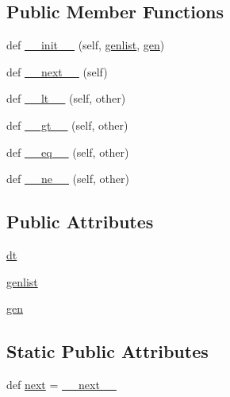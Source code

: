 \subsection*{Public Member Functions}
\begin{DoxyCompactItemize}
\item 
def \hyperlink{classdateutil_1_1rrule_1_1rruleset_1_1__genitem_a8900893f286614708976c0ee31b39bef}{\+\_\+\+\_\+init\+\_\+\+\_\+} (self, \hyperlink{classdateutil_1_1rrule_1_1rruleset_1_1__genitem_a8b48fbda46d708d8649dc3f4a15b351e}{genlist}, \hyperlink{classdateutil_1_1rrule_1_1rruleset_1_1__genitem_a79dc2bb16f088fb093f0bed12382631c}{gen})
\item 
def \hyperlink{classdateutil_1_1rrule_1_1rruleset_1_1__genitem_a63537febb60c79e635e3fb5784130083}{\+\_\+\+\_\+next\+\_\+\+\_\+} (self)
\item 
def \hyperlink{classdateutil_1_1rrule_1_1rruleset_1_1__genitem_a9c4fecb66d9f551cc6612b7a85582980}{\+\_\+\+\_\+lt\+\_\+\+\_\+} (self, other)
\item 
def \hyperlink{classdateutil_1_1rrule_1_1rruleset_1_1__genitem_a4508727444d2981036d84edfb589e4b5}{\+\_\+\+\_\+gt\+\_\+\+\_\+} (self, other)
\item 
def \hyperlink{classdateutil_1_1rrule_1_1rruleset_1_1__genitem_a1e1d9a7606ba020013090a88fdc36136}{\+\_\+\+\_\+eq\+\_\+\+\_\+} (self, other)
\item 
def \hyperlink{classdateutil_1_1rrule_1_1rruleset_1_1__genitem_a049f466fd353b3d4fcdb668c3d2b6550}{\+\_\+\+\_\+ne\+\_\+\+\_\+} (self, other)
\end{DoxyCompactItemize}
\subsection*{Public Attributes}
\begin{DoxyCompactItemize}
\item 
\hyperlink{classdateutil_1_1rrule_1_1rruleset_1_1__genitem_a29fbcb5358213b918f0edff34cd282e8}{dt}
\item 
\hyperlink{classdateutil_1_1rrule_1_1rruleset_1_1__genitem_a8b48fbda46d708d8649dc3f4a15b351e}{genlist}
\item 
\hyperlink{classdateutil_1_1rrule_1_1rruleset_1_1__genitem_a79dc2bb16f088fb093f0bed12382631c}{gen}
\end{DoxyCompactItemize}
\subsection*{Static Public Attributes}
\begin{DoxyCompactItemize}
\item 
def \hyperlink{classdateutil_1_1rrule_1_1rruleset_1_1__genitem_ac431927a4a9b3db8b044c6399d09614a}{next} = \hyperlink{classdateutil_1_1rrule_1_1rruleset_1_1__genitem_a63537febb60c79e635e3fb5784130083}{\+\_\+\+\_\+next\+\_\+\+\_\+}
\end{DoxyCompactItemize}


